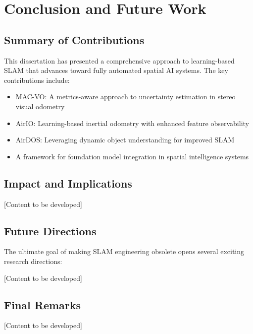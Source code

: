 \chapter{Conclusion and Future Work} \label{chapter:conclusion}

\section{Summary of Contributions}

This dissertation has presented a comprehensive approach to learning-based SLAM that advances toward fully automated spatial AI systems. The key contributions include:

\begin{itemize}
    \item MAC-VO: A metrics-aware approach to uncertainty estimation in stereo visual odometry
    \item AirIO: Learning-based inertial odometry with enhanced feature observability
    \item AirDOS: Leveraging dynamic object understanding for improved SLAM
    \item A framework for foundation model integration in spatial intelligence systems
\end{itemize}

\section{Impact and Implications}

[Content to be developed]

\section{Future Directions}

The ultimate goal of making SLAM engineering obsolete opens several exciting research directions:

[Content to be developed]

\section{Final Remarks}

[Content to be developed]